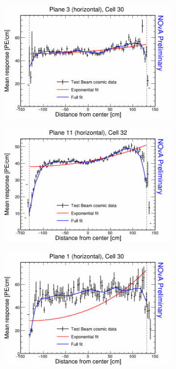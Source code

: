 \begin{figure}[!hbtp]
  \begin{subfigure}{0.495\textwidth}
    \includegraphics[width=\linewidth]{Plots/RelativeCalibrationResults/p2_003_030.png}
  \end{subfigure}
  \begin{subfigure}{0.495\textwidth}
    \includegraphics[width=\linewidth]{Plots/RelativeCalibrationResults/p2_011_032.png}
  \end{subfigure}
  \begin{subfigure}{0.495\textwidth}
    \includegraphics[width=\linewidth]{Plots/RelativeCalibrationResults/p2_001_030.png}

\end{subfigure}
\end{figure}
